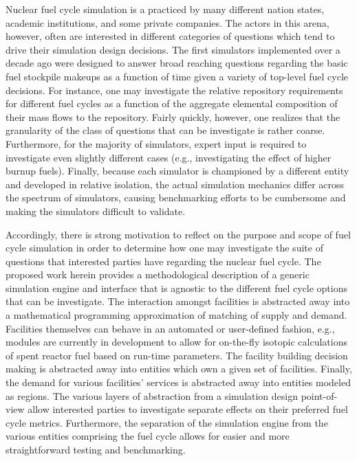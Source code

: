 Nuclear fuel cycle simulation is a practiced by many different nation states,
academic institutions, and some private companies. The actors in this arena,
however, often are interested in different categories of questions which tend to
drive their simulation design decisions. The first simulators implemented over a
decade ago were designed to answer broad reaching questions regarding the basic
fuel stockpile makeups as a function of time given a variety of top-level fuel
cycle decisions. For instance, one may investigate the relative repository
requirements for different fuel cycles as a function of the aggregate elemental
composition of their mass flows to the repository. Fairly quickly, however, one
realizes that the granularity of the class of questions that can be investigate
is rather coarse. Furthermore, for the majority of simulators, expert input is
required to investigate even slightly different cases (e.g., investigating the
effect of higher burnup fuels). Finally, because each simulator is championed by
a different entity and developed in relative isolation, the actual simulation
mechanics differ across the spectrum of simulators, causing benchmarking efforts
to be cumbersome and making the simulators difficult to validate.

Accordingly, there is strong motivation to reflect on the purpose and scope of
fuel cycle simulation in order to determine how one may investigate the suite of
questions that interested parties have regarding the nuclear fuel cycle. The
proposed work herein provides a methodological description of a generic
simulation engine and interface that is agnostic to the different fuel cycle
options that can be investigate. The interaction amongst facilities is
abstracted away into a mathematical programming approximation of matching of
supply and demand. Facilities themselves can behave in an automated or
user-defined fashion, e.g., modules are currently in development to allow for
on-the-fly isotopic calculations of spent reactor fuel based on run-time
parameters. The facility building decision making is abstracted away into
entities which own a given set of facilities. Finally, the demand for various
facilities' services is abstracted away into entities modeled as regions. The
various layers of abstraction from a simulation design point-of-view allow
interested parties to investigate separate effects on their preferred fuel cycle
metrics. Furthermore, the separation of the simulation engine from the various
entities comprising the fuel cycle allows for easier and more straightforward
testing and benchmarking.

